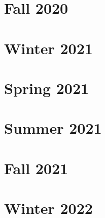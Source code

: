 \documentclass[hidelinks, 12pt]{article} %
\begin{document}
\newpage
\listoffigures

\newpage
\listoftables

\printglossary[type=\acronymtype]
\newpage
\section{Fall 2020}


\newpage
\section{Winter 2021}

\pagebreak
\newpage
\section{Spring 2021}

\pagebreak
\newpage
\section{Summer 2021}

\pagebreak



\newpage
\section{Fall 2021}

\pagebreak

\newpage
\section{Winter 2022}

\pagebreak
\end{document}
